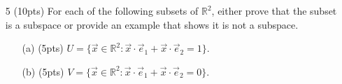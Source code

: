 \documentclass{article}
\newcommand{\R}{\mathbb{R}}
\newcommand{\Proj}{\mathrm{proj}}
\newcommand{\mat}[1]{\begin{bmatrix}#1\end{bmatrix}}
\begin{document}
\begin{enumerate}
	\clearpage

	\item[5 (10pts)] For each of the following subsets of $\R^2$, either prove that the subset is a subspace
		or provide an example that shows it is not a subspace.
	\begin{enumerate}
		\item[(a) (5pts)] $U=\{\vec x\in \R^2: \vec x\cdot \vec e_1+\vec x\cdot \vec e_2 = 1\}$.
		\vspace{4in}
		\item[(b) (5pts)] $V=\{\vec x \in \R^2: \vec x\cdot \vec e_1+\vec x\cdot \vec e_2=0\}$.
	\end{enumerate}
	\clearpage


\end{enumerate}
\end{document}
